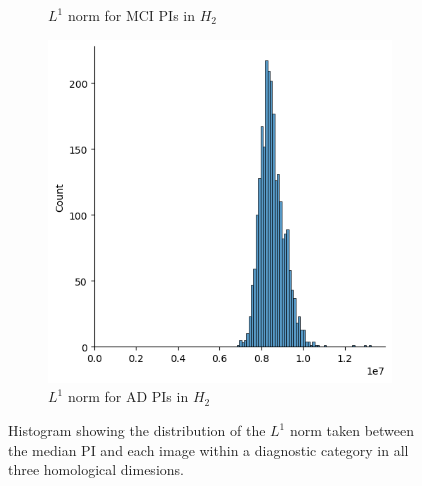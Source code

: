\documentclass{article}
\begin{document}
\begin{figure}
\begin{subfigure}{0.32\textwidth}
    \caption{$L^1$ norm for MCI PIs in $H_2$}
  \end{subfigure}
  \begin{subfigure}{0.32\textwidth}
    \includegraphics[width=\textwidth]{figures/PIs/displot_median_pi_AD_H_2.png}
    \caption{$L^1$ norm for AD PIs in $H_2$}
  \end{subfigure}
  \caption{Histogram showing the distribution of the $L^1$ norm taken between the median PI and each image within a diagnostic category in all three homological dimesions.}
  \label{fig:displots_median_pi}
\end{figure}
\end{document}
